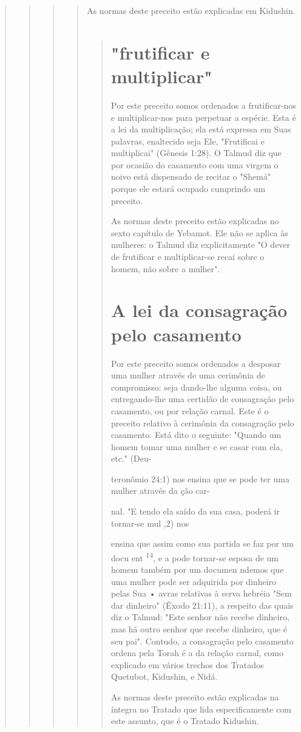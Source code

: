 \begin{quote}
\begin{quote}
\begin{quote}
\begin{quote}
As normas deste preceito estão explicadas em Kidushin.

\begin{quote}
\section{"frutificar e multiplicar"}

Por este preceito somos ordenados a frutificar-nos e multiplicar-nos
para perpetuar a espécie. Esta é a lei da multiplicação; ela está
expressa em Suas palavras, enaltecido seja Ele, "Frutificai e
multiplicai" (Gênesis 1:28). O Talmud diz que por ocasião do casamento
com uma virgem o noivo está dispensado de recitar o "Shemá" porque ele
estará ocupado cumprindo um preceito.

As normas deste preceito estão explicadas no sexto capítulo de Ye­bamot.
Ele não se aplica às mulheres: o Talmud diz explicitamente "O dever de
frutificar e multiplicar-se recai sobre o homem, não sobre a mulher".

\section{A lei da consagração pelo casamento}

Por este preceito somos ordenados a desposar uma mulher através de uma
cerimônia de compromisso: seja dando-lhe alguma coisa, ou entregando-lhe
uma certidão de consagração pelo casamento, ou por relação carnal. Este
é o preceito relativo à cerimônia da consagração pelo casamento. Está
dito o seguinte: "Quando um homem tomar uma mulher e se casar com ela,
etc." (Deu-

teronômio 24:1) nos ensina que se pode ter uma mulher através da ção
car-

nal. "E tendo ela saído da sua casa, poderá ir tornar-se mul ,2) nos

ensina que assim como sua partida se faz por um docu ent
\textsuperscript{14}, e a pode tornar-se esposa de um homem também por
um documen ndemos que uma mulher pode ser adquirida por dinheiro pelas
Sua • avras relativas à serva hebréia "Sem dar dinheiro" (Êxodo 21:11),
a respeito das quais diz o Talmud: "Este senhor não recebe dinheiro, mas
há outro senhor que recebe dinheiro, que é seu pai". Contudo, a
consagração pelo casamento ordena pela Torah é a da relação carnal, como
explicado em vários trechos dos Tratados Quetubot, Kidushin, e Nidá.

As normas deste preceito estão explicadas na íntegra no Tratado que lida
especificamente com este assunto, que é o Tratado Kidushin.


\end{quote}
\end{quote}
\end{quote}
\end{quote}
\end{quote}
